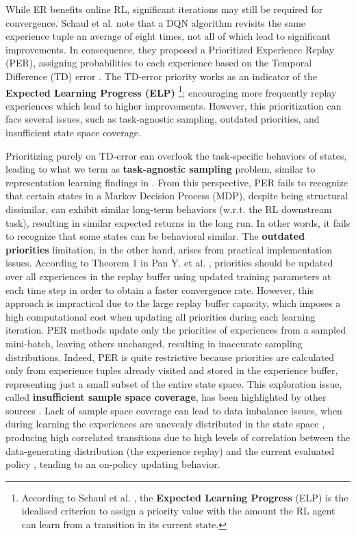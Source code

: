 While ER benefits online RL, significant iterations may still be required for convergence. Schaul et al. \cite{schaul2015prioritized} note that a DQN algorithm revisits the same experience tuple an average of eight times, not all of which lead to significant improvements. In consequence, they proposed a Prioritized Experience Replay (PER), assigning probabilities to each experience based on the Temporal Difference (TD) error \cite{sutton2018reinforcement}. The TD-error priority works as an indicator of the \textbf{Expected Learning Progress (ELP)} \cite{schaul2015prioritized}\footnote{According to Schaul et al. \cite{schaul2015prioritized}, the \textbf{Expected Learning Progress} (ELP) is the idealised criterion to assign a priority value with the amount the RL agent can learn from a transition in its current state.}; encouraging more frequently replay experiences which lead to higher improvements. However, this prioritization can face several issues, such as task-agnostic sampling, outdated priorities, and insufficient state space coverage.

Prioritizing purely on TD-error can overlook the task-specific behaviors of states, leading to what we term as \textbf{task-agnostic sampling} problem, similar to representation learning findings in \cite{zhang2020learning}. From this perspective, PER fails to recognize that certain states in a Markov Decision Process (MDP), despite being structural dissimilar, can exhibit similar long-term behaviors (w.r.t. the RL downstream task), resulting in similar expected returns in the long run. In other words, it fails to recognize that some states can be behavioral similar. The \textbf{outdated priorities} limitation, in the other hand, arises from practical implementation issues. According to Theorem 1 in Pan Y. et al. \cite{pan2022understanding}, priorities should be updated over all experiences in the replay buffer using updated training parameters at each time step in order to obtain a faster convergence rate. However, this approach is impractical due to the large replay buffer capacity, which imposes a high computational cost when updating all priorities during each learning iteration. PER \cite{schaul2015prioritized} methods update only the priorities of experiences from a sampled mini-batch, leaving others unchanged, resulting in inaccurate sampling distributions. Indeed, PER is quite restrictive because priorities are calculated only from experience tuples already visited and stored in the experience buffer, representing just a small subset of the entire state space. This exploration issue, called \textbf{insufficient sample space coverage}, has been highlighted by other sources \cite{fedus2020revisiting,pan2022understanding}. Lack of sample space coverage can lead to data imbalance issues, when during learning the experiences are unevenly distributed in the state space \cite{chen2023attention}, producing high correlated transitions due to high levels of correlation between the data-generating distribution (the experience replay) and the current evaluated policy \cite{fedus2020revisiting}, tending to an on-policy updating behavior.

